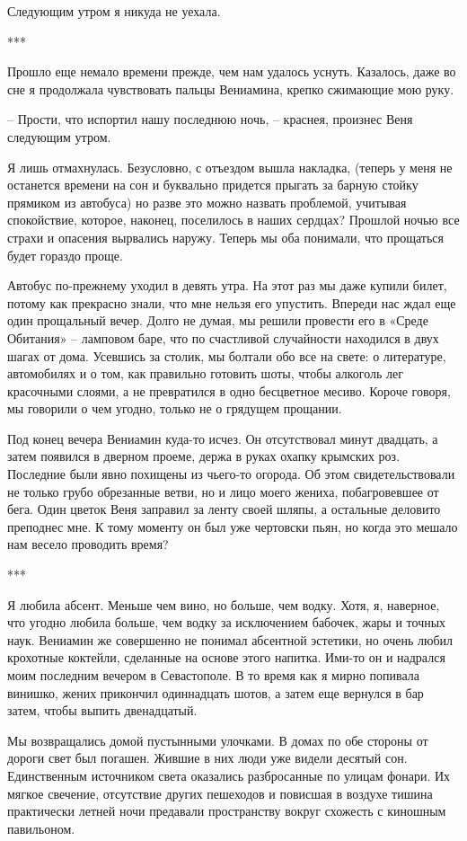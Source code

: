 \documentclass[
]{book}
\begin{document}
Следующим утром я никуда не уехала.

***

Прошло еще немало времени прежде, чем нам удалось уснуть. Казалось, даже во сне я продолжала чувствовать пальцы Вениамина, крепко сжимающие мою руку.

-- Прости, что испортил нашу последнюю ночь, -- краснея, произнес Веня следующим утром.

Я лишь отмахнулась. Безусловно, с отъездом вышла накладка, (теперь у меня не останется времени на сон и буквально придется прыгать за барную стойку прямиком из автобуса) но разве это можно назвать проблемой, учитывая спокойствие, которое, наконец, поселилось в наших сердцах? Прошлой ночью все страхи и опасения вырвались наружу. Теперь мы оба понимали, что прощаться будет гораздо проще.

Автобус по-прежнему уходил в девять утра. На этот раз мы даже купили билет, потому как прекрасно знали, что мне нельзя его упустить. Впереди нас ждал еще один прощальный вечер. Долго не думая, мы решили провести его в «Среде Обитания» -- ламповом баре, что по счастливой случайности находился в двух шагах от дома. Усевшись за столик, мы болтали обо все на свете: о литературе, автомобилях и о том, как правильно готовить шоты, чтобы алкоголь лег красочными слоями, а не превратился в одно бесцветное месиво. Короче говоря, мы говорили о чем угодно, только не о грядущем прощании.

Под конец вечера Вениамин куда-то исчез. Он отсутствовал минут двадцать, а затем появился в дверном проеме, держа в руках охапку крымских роз. Последние были явно похищены из чьего-то огорода. Об этом свидетельствовали не только грубо обрезанные ветви, но и лицо моего жениха, побагровевшее от бега. Один цветок Веня заправил за ленту своей шляпы, а остальные деловито преподнес мне. К тому моменту он был уже чертовски пьян, но когда это мешало нам весело проводить время?

***

Я любила абсент. Меньше чем вино, но больше, чем водку. Хотя, я, наверное, что угодно любила больше, чем водку за исключением бабочек, жары и точных наук. Вениамин же совершенно не понимал абсентной эстетики, но очень любил крохотные коктейли, сделанные на основе этого напитка. Ими-то он и надрался моим последним вечером в Севастополе. В то время как я мирно попивала винишко, жених прикончил одиннадцать шотов, а затем еще вернулся в бар затем, чтобы выпить двенадцатый.

Мы возвращались домой пустынными улочками. В домах по обе стороны от дороги свет был погашен. Жившие в них люди уже видели десятый сон. Единственным источником света оказались разбросанные по улицам фонари. Их мягкое свечение, отсутствие других пешеходов и повисшая в воздухе тишина практически летней ночи предавали пространству вокруг схожесть с киношным павильоном.
\end{document}
